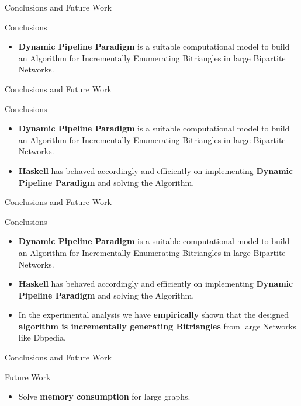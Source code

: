 \begin{frame}[fragile]{Conclusions and Future Work}
  \begin{block}{Conclusions}      
    \begin{itemize}
      \item \textbf{Dynamic Pipeline Paradigm} is a suitable computational model to build an Algorithm for Incrementally Enumerating Bitriangles in large Bipartite Networks. 
    \end{itemize}
  \end{block}
\end{frame}

\begin{frame}[fragile]{Conclusions and Future Work}
  \begin{block}{Conclusions}      
    \begin{itemize}
      \item {\color{light}\textbf{Dynamic Pipeline Paradigm} is a suitable computational model to build an Algorithm for Incrementally Enumerating Bitriangles in large Bipartite Networks. }
      \item \textbf{Haskell} has behaved accordingly and efficiently on implementing \textbf{Dynamic Pipeline Paradigm} and solving the Algorithm.
    \end{itemize}
  \end{block}
\end{frame}

\begin{frame}[fragile]{Conclusions and Future Work}
  \begin{block}{Conclusions}      
    \begin{itemize}
      \item {\color{light}\textbf{Dynamic Pipeline Paradigm} is a suitable computational model to build an Algorithm for Incrementally Enumerating Bitriangles in large Bipartite Networks. }
      \item {\color{light}\textbf{Haskell} has behaved accordingly and efficiently on implementing \textbf{Dynamic Pipeline Paradigm} and solving the Algorithm.}
      \item In the experimental analysis we have \textbf{empirically} shown that the designed \textbf{algorithm is incrementally generating Bitriangles} from large Networks like Dbpedia. 
    \end{itemize}
  \end{block}
\end{frame}

\begin{frame}[fragile]{Conclusions and Future Work}
  \begin{block}{Future Work}      
    \begin{itemize}
      \item Solve \textbf{memory consumption} for large graphs.
    \end{itemize}
  \end{block}
\end{frame}


